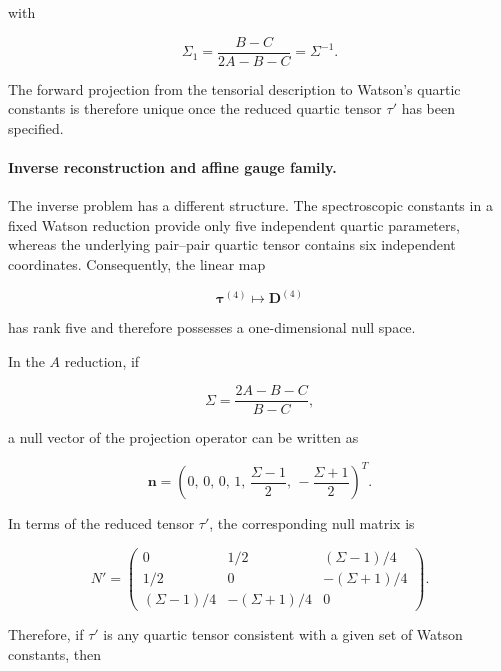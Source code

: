 with

\begin{equation}
\Sigma_1=\frac{B-C}{2A-B-C}=\Sigma^{-1}.
\end{equation}

The forward projection from the tensorial description to Watson's
quartic constants is therefore unique once the reduced quartic tensor
$\tau'$ has been specified.

\paragraph{Inverse reconstruction and affine gauge family.}

The inverse problem has a different structure.
The spectroscopic constants in a fixed Watson reduction provide only
five independent quartic parameters, whereas the underlying pair--pair
quartic tensor contains six independent coordinates.
Consequently, the linear map

\begin{equation}
\boldsymbol\tau^{(4)} \longmapsto \mathbf D^{(4)}
\end{equation}

has rank five and therefore possesses a one-dimensional null space.

In the $A$ reduction, if

\begin{equation}
\Sigma=\frac{2A-B-C}{B-C},
\end{equation}

a null vector of the projection operator can be written as

\begin{equation}
\mathbf n =
\left(
0,\,
0,\,
0,\,
1,\,
\frac{\Sigma-1}{2},\,
-\frac{\Sigma+1}{2}
\right)^T.
\label{eq:quartic_null_vector}
\end{equation}

In terms of the reduced tensor $\tau'$, the corresponding null matrix is

\begin{equation}
N'=
\begin{pmatrix}
0 & 1/2 & (\Sigma-1)/4 \\
1/2 & 0 & -(\Sigma+1)/4 \\
(\Sigma-1)/4 & -(\Sigma+1)/4 & 0
\end{pmatrix}.
\label{eq:quartic_null_matrix}
\end{equation}

Therefore, if $\tau'$ is any quartic tensor consistent with a given set
of Watson constants, then

